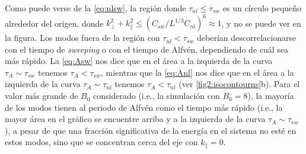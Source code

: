 Como puede verse de la \cref{eq:nlsw}, la región donde
$\tau_{nl}\leq\tau_{sw}$ es un círculo pequeño alrededor del origen,
donde $k_\perp^2 + k_\parallel^2 \leq (C_{sw}/L^{1/3}C_{nl})^6 \approx
1$, y no se puede ver en la figura. Los modos fuera de la región con
$\tau_{nl}<\tau_{sw}$ deberían descorrelacionarse con el tiempo de
\textit{sweeping} o con el tiempo de Alfvén, dependiendo de cuál sea
más rápido. La \cref{eq:Asw} nos dice que en el área a la izquierda de
la curva $\tau_A\sim\tau_{sw}$ tenemos $\tau_A<\tau_{sw}$, mientras
que la \cref{eq:Anl} nos dice que en el área a la izquierda de la
curva $\tau_A\sim\tau_{nl}$ tenemos $\tau_A<\tau_{nl}$ (ver
\cref{fig2:isocontourns}b). Para el valor más grande de $B_0$
considerado (i.e., la simulación con $B_0=8$), la mayoría de los modos
tienen al periodo de Alfvén como el tiempo más rápido (i.e., la mayor
área en el gráfico se encuentre arriba y a la izquierda de la curva
$\tau_A \sim \tau_{sw}$), a pesar de que una fracción significativa de
la energía en el sistema no esté en estos modos, sino que se
concentran cerca del eje con $k_\parallel = 0$.

